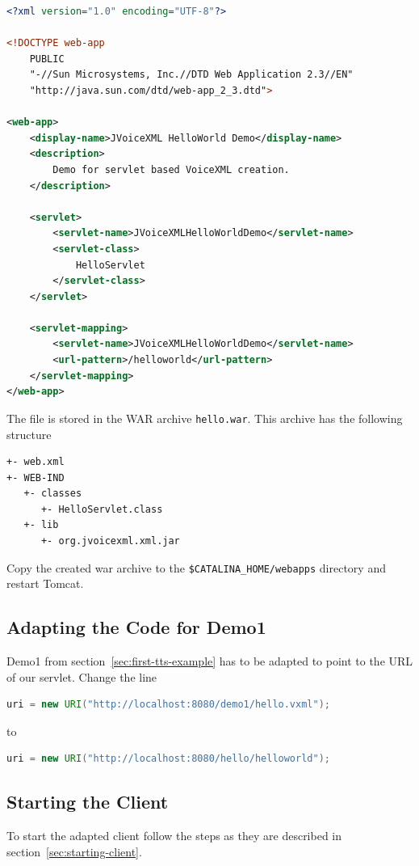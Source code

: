 \documentclass[11pt,a4paper]{book}
\begin{document}
\begin{lstlisting}[language=XML]
<?xml version="1.0" encoding="UTF-8"?>

<!DOCTYPE web-app
    PUBLIC
    "-//Sun Microsystems, Inc.//DTD Web Application 2.3//EN"
    "http://java.sun.com/dtd/web-app_2_3.dtd">

<web-app>
    <display-name>JVoiceXML HelloWorld Demo</display-name>
    <description>
        Demo for servlet based VoiceXML creation.
    </description>

    <servlet>
        <servlet-name>JVoiceXMLHelloWorldDemo</servlet-name>
        <servlet-class>
            HelloServlet
        </servlet-class>
    </servlet>

    <servlet-mapping>
        <servlet-name>JVoiceXMLHelloWorldDemo</servlet-name>
        <url-pattern>/helloworld</url-pattern>
    </servlet-mapping>
</web-app>
\end{lstlisting}

The file is stored in the WAR archive \texttt{hello.war}. This archive has the
following structure
\begin{lstlisting}
+- web.xml
+- WEB-IND
   +- classes
      +- HelloServlet.class
   +- lib
      +- org.jvoicexml.xml.jar
\end{lstlisting}

Copy the created war archive to the \texttt{\$CATALINA\_HOME/webapps}
directory and restart Tomcat.

\subsection{Adapting the Code for Demo1}

Demo1 from section~\ref{sec:first-tts-example} has to be adapted to point to
the URL of our servlet. Change the line
\begin{lstlisting}[language=Java]
uri = new URI("http://localhost:8080/demo1/hello.vxml");
\end{lstlisting}
to
\begin{lstlisting}[language=Java]
uri = new URI("http://localhost:8080/hello/helloworld");
\end{lstlisting}

\subsection{Starting the Client}

To start the adapted client follow the steps as they are described in
section~\ref{sec:starting-client}.
\end{document}
